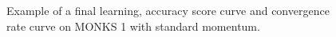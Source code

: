\begin{appendices}
\begin{figure}[H]
\begin{subfigure}{0.40\textwidth}
                    \label{fig:monks_1_ACC_SGD}
                \end{subfigure}
                \begin{subfigure}{0.40\textwidth}
                    \caption{}
                    \label{fig:monks_1_NORM_SGD}
                \end{subfigure}
                \caption{Example of a final learning, accuracy score curve and
                convergence rate curve on MONKS 1 with standard momentum.}
                \label{fig:monks_1_SGD}
            \end{figure}


\end{appendices}
